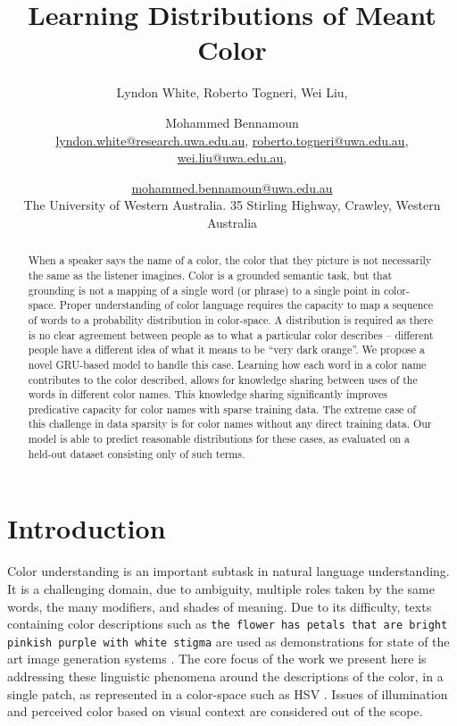 \documentclass[11pt,a4paper]{article}
\title{Learning Distributions of Meant Color}
\author{Lyndon White, %
	Roberto Togneri, %
	Wei Liu, %
	\and Mohammed Bennamoun%
	\\ 
	\url{lyndon.white@research.uwa.edu.au}, %
	\url{roberto.togneri@uwa.edu.au},\\
	\url{wei.liu@uwa.edu.au}, %
	\and \url{mohammed.bennamoun@uwa.edu.au}%
	\\
	The University of Western Australia.
	35 Stirling Highway, Crawley, Western Australia
}
\newcommand{\parencite}{\citep}
\begin{document}
\maketitle

\begin{abstract}
When a speaker says the name of a color, the color that they picture is not necessarily the same as the listener imagines.
Color is a grounded semantic task, but that grounding is not a mapping of a single word (or phrase) to a single point in color-space.
Proper understanding of color language requires the capacity to map a sequence of words to a probability distribution in color-space.
A distribution is required as there is no clear agreement between people as to what a particular color describes -- different people have a different idea of what it means to be ``very dark orange''.
We propose a novel GRU-based model to handle this case.
Learning how each word in a color name contributes to the color described,
allows for knowledge sharing between uses of the words in different color names.
This knowledge sharing significantly improves predicative capacity for color names with sparse training data.
The extreme case of this challenge in data sparsity is for color names without any direct training data.
Our model is able to predict reasonable distributions for these cases, as evaluated on a held-out dataset consisting only of such terms.
\end{abstract}

\section{Introduction}\label{sec:intro}

Color understanding is an important subtask in natural language understanding.
It is a challenging domain, due to ambiguity, multiple roles taken by the same words, the many modifiers, and shades of meaning.
Due to its difficulty, texts containing color descriptions such as \texttt{the flower has petals that are bright pinkish purple with white stigma} are used as demonstrations for state of the art image generation systems \parencite{reed2016generative, 2015arXiv151102793M}.
The core focus of the work we present here is addressing these linguistic phenomena around the descriptions of the color, in a single patch, as represented in a color-space such as HSV \parencite{smith1978color}.
Issues of illumination and perceived color based on visual context are considered out of the scope.
\end{document}
